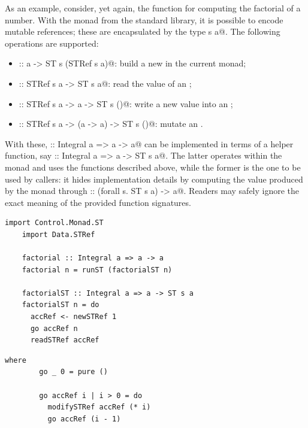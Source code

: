 \documentclass[UdineBachThesis,american,11pt]{PhdThesis}
\begin{document}
  As an example, consider, yet again, the function for computing the factorial
  of a number. With the \lstinline@ST@ monad from the standard library, it is
  possible to encode mutable references; these are encapsulated by the type
  \lstinline@STRef s a@. The following operations are supported:

  \begin{itemize}
    \item \lstinline@newSTRef :: a -> ST s (STRef s a)@: build a new
    \lstinline@STRef@ in the current \lstinline@ST@ monad;

    \item \lstinline@readSTRef :: STRef s a -> ST s a@: read the value of an
    \lstinline@STRef@;

    \item \lstinline@writeSTRef :: STRef s a -> a -> ST s ()@: write a new value
    into an \lstinline@STRef@;

    \item \lstinline@modifySTRef :: STRef s a -> (a -> a) -> ST s ()@: mutate an
    \lstinline@STRef@.
  \end{itemize}

  With these, \lstinline@factorial :: Integral a => a -> a@ can be implemented
  in terms of a helper function, say
  \lstinline@factorialST :: Integral a => a -> ST s a@. The latter operates
  within the \lstinline@ST@ monad and uses the functions described above, while
  the former is the one to be used by callers: it hides implementation details
  by computing the value produced by the \lstinline@ST@ monad through
  \lstinline@runST :: (forall s. ST s a) -> a@. Readers may safely ignore the
  exact meaning of the provided function signatures.

  \begin{lstlisting}[gobble=4,basicstyle=\ttfamily\small]
    import Control.Monad.ST
    import Data.STRef

    factorial :: Integral a => a -> a
    factorial n = runST (factorialST n)

    factorialST :: Integral a => a -> ST s a
    factorialST n = do
      accRef <- newSTRef 1
      go accRef n
      readSTRef accRef
  \end{lstlisting}

  \pagebreak

  \begin{lstlisting}[gobble=4,basicstyle=\ttfamily\small]
      where
        go _ 0 = pure ()

        go accRef i | i > 0 = do
          modifySTRef accRef (* i)
          go accRef (i - 1)
  \end{lstlisting}
\end{document}

